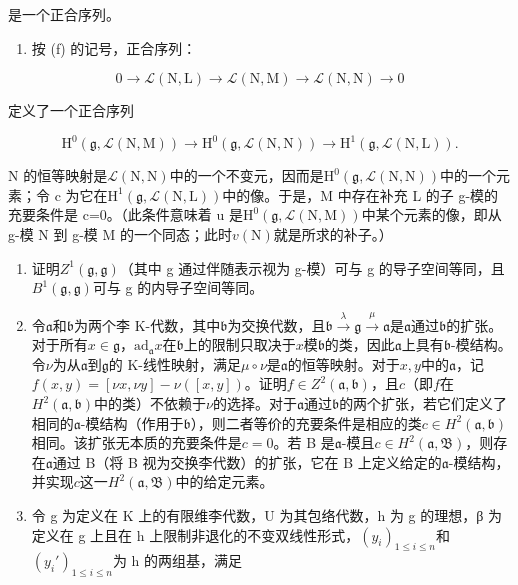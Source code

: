 是一个正合序列。

\begin{enumerate}
\def\labelenumi{(\alph{enumi})}
\setcounter{enumi}{6}
\tightlist
\item
  按 (f) 的记号，正合序列：
\end{enumerate}

\[
0 \to \mathscr {L} (\mathrm{N}, \mathrm{L}) \to \mathscr {L} (\mathrm{N}, \mathrm{M}) \to \mathscr {L} (\mathrm{N}, \mathrm{N}) \to 0
\]

定义了一个正合序列

\[
\mathrm{H} ^ {0} (\mathfrak {g}, \mathscr {L} (\mathrm{N}, \mathrm{M})) \rightarrow \mathrm{H} ^ {0} (\mathfrak {g}, \mathscr {L} (\mathrm{N}, \mathrm{N})) \rightarrow \mathrm{H} ^ {1} (\mathfrak {g}, \mathscr {L} (\mathrm{N}, \mathrm{L})).
\]

 N 的恒等映射是\(\mathcal{L}(\mathrm{N},\mathrm{N})\)中的一个不变元，因而是\(\mathrm{H}^{0}(\mathfrak{g},\mathcal{L}(\mathrm{N},\mathrm{N}))\)中的一个元素；令 c 为它在\(\mathrm{H}^{1}(\mathfrak{g},\mathcal{L}(\mathrm{N},\mathrm{L}))\)中的像。于是，M 中存在补充 L 的子 g-模的充要条件是 c=0。（此条件意味着 u 是\(\mathrm{H}^{0}(\mathfrak{g},\mathcal{L}(\mathrm{N},\mathrm{M}))\)中某个元素的像，即从 g-模 N 到 g-模 M 的一个同态；此时\(v(\mathrm{N})\)就是所求的补子。）

\begin{enumerate}
\def\labelenumi{(\alph{enumi})}
\setcounter{enumi}{7}
\item
  证明\(Z^{1}(\mathfrak{g},\mathfrak{g})\)（其中 g 通过伴随表示视为 g-模）可与 g 的导子空间等同，且\(B^{1}(\mathfrak{g},\mathfrak{g})\)可与 g 的内导子空间等同。
\item
  令\(\mathfrak{a}\)和\(\mathfrak{b}\)为两个李 K-代数，其中\(\mathfrak{b}\)为交换代数，且\(\mathfrak{b} \xrightarrow{\lambda} \mathfrak{g} \xrightarrow{\mu} \mathfrak{a}\)是\(\mathfrak{a}\)通过\(\mathfrak{b}\)的扩张。对于所有\(x \in \mathfrak{g}\)，\(\mathrm{ad}_{\mathfrak{a}} x\)在\(\mathfrak{b}\)上的限制只取决于\(x\)模\(\mathfrak{b}\)的类，因此\(\mathfrak{a}\)上具有\(\mathfrak{b}\)-模结构。令\(\nu\)为从\(\mathfrak{a}\)到\(\mathfrak{g}\)的 K-线性映射，满足\(\mu \circ \nu\)是\(\mathfrak{a}\)的恒等映射。对于\(x, y\)中的\(\mathfrak{a}\)，记\(f(x, y) = [\nu x, \nu y] - \nu([x, y])\)。证明\(f \in Z^2(\mathfrak{a}, \mathfrak{b})\)，且\(c\)（即\(f\)在\(H^2(\mathfrak{a}, \mathfrak{b})\)中的类）不依赖于\(\nu\)的选择。对于\(\mathfrak{a}\)通过\(\mathfrak{b}\)的两个扩张，若它们定义了相同的\(\mathfrak{a}\)-模结构（作用于\(\mathfrak{b}\)），则二者等价的充要条件是相应的类\(c \in H^2(\mathfrak{a}, \mathfrak{b})\)相同。该扩张无本质的充要条件是\(c = 0\)。若 B 是\(\mathfrak{a}\)-模且\(c \in H^2(\mathfrak{a}, \mathfrak{B})\)，则存在\(\mathfrak{a}\)通过 B（将 B 视为交换李代数）的扩张，它在 B 上定义给定的\(\mathfrak{a}\)-模结构，并实现\(c\)这一\(H^2(\mathfrak{a}, \mathfrak{B})\)中的给定元素。
\item
  令 g 为定义在 K 上的有限维李代数，U 为其包络代数，h 为 g 的理想，β 为定义在 g 上且在 h 上限制非退化的不变双线性形式，\((y_{i})_{1 \leqslant i \leqslant n}\)和\((y_{i}')_{1 \leqslant i \leqslant n}\)为 h 的两组基，满足
\end{enumerate}

